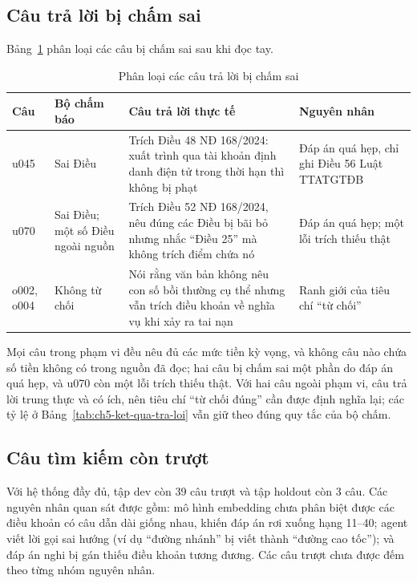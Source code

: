 \subsection{Câu trả lời bị chấm sai}

Bảng~\ref{tab:ch5-loi-tra-loi} phân loại các câu bị chấm sai sau khi đọc tay.

\begin{table}[H]
\centering
\caption{Phân loại các câu trả lời bị chấm sai}
\label{tab:ch5-loi-tra-loi}
\footnotesize
\setlength{\tabcolsep}{4pt}
\begin{tabularx}{\textwidth}{@{}l >{\raggedright\arraybackslash}p{2.6cm} >{\raggedright\arraybackslash}X >{\raggedright\arraybackslash}p{3.2cm}@{}}
\toprule
\textbf{Câu} & \textbf{Bộ chấm báo} & \textbf{Câu trả lời thực tế} & \textbf{Nguyên nhân} \\
\midrule
u045 & Sai Điều & Trích Điều 48 NĐ 168/2024: xuất trình qua tài khoản định danh điện tử trong thời hạn thì không bị phạt & Đáp án quá hẹp, chỉ ghi Điều 56 Luật TTATGTĐB \\
u070 & Sai Điều; một số Điều ngoài nguồn & Trích Điều 52 NĐ 168/2024, nêu đúng các Điều bị bãi bỏ nhưng nhắc ``Điều 25'' mà không trích điểm chứa nó & Đáp án quá hẹp; một lỗi trích thiếu thật \\
o002, o004 & Không từ chối & Nói rằng văn bản không nêu con số bồi thường cụ thể nhưng vẫn trích điều khoản về nghĩa vụ khi xảy ra tai nạn & Ranh giới của tiêu chí ``từ chối'' \\
\bottomrule
\end{tabularx}
\end{table}

Mọi câu trong phạm vi đều nêu đủ các mức tiền kỳ vọng, và không câu nào chứa số tiền không có trong nguồn đã đọc; hai câu bị chấm sai một phần do đáp án quá hẹp, và u070 còn một lỗi trích thiếu thật. Với hai câu ngoài phạm vi, câu trả lời trung thực và có ích, nên tiêu chí ``từ chối đúng'' cần được định nghĩa lại; các tỷ lệ ở Bảng~\ref{tab:ch5-ket-qua-tra-loi} vẫn giữ theo đúng quy tắc của bộ chấm.

\subsection{Câu tìm kiếm còn trượt}

Với hệ thống đầy đủ, tập dev còn 39 câu trượt và tập holdout còn 3 câu. Các nguyên nhân quan sát được gồm: mô hình embedding chưa phân biệt được các điều khoản có câu dẫn dài giống nhau, khiến đáp án rơi xuống hạng 11--40; agent viết lời gọi sai hướng (ví dụ ``đường nhánh'' bị viết thành ``đường cao tốc''); và đáp án nghi bị gán thiếu điều khoản tương đương. Các câu trượt chưa được đếm theo từng nhóm nguyên nhân.

